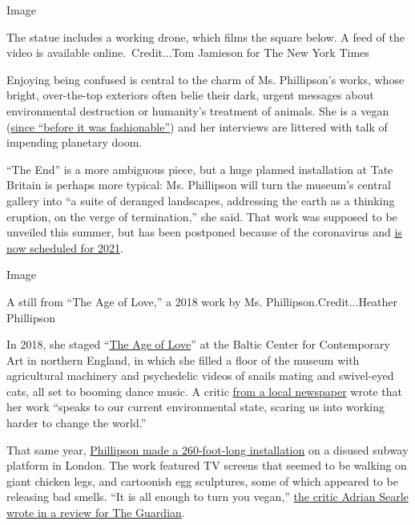 Image

The statue includes a working drone, which films the square below. A
feed of the video is available online.~Credit...Tom Jamieson for The New
York Times

Enjoying being confused is central to the charm of Ms. Phillipson's
works, whose bright, over-the-top exteriors often belie their dark,
urgent messages about environmental destruction or humanity's treatment
of animals. She is a vegan
(\href{https://www.theguardian.com/artanddesign/2018/aug/27/heather-phillipson-interview-vegan-artist-we-torture-eggs}{since
``before it was fashionable''}) and her interviews are littered with
talk of impending planetary doom.

``The End'' is a more ambiguous piece, but a huge planned installation
at Tate Britain is perhaps more typical: Ms. Phillipson will turn the
museum's central gallery into ``a suite of deranged landscapes,
addressing the earth as a thinking eruption, on the verge of
termination,'' she said. That work was supposed to be unveiled this
summer, but has been postponed because of the coronavirus and
\href{https://www.tate.org.uk/whats-on/tate-britain/exhibition/heather-phillipson}{is
now scheduled for 2021}.

Image

A still from ``The Age of Love,'' a 2018 work by Ms.
Phillipson.Credit...Heather Phillipson

In 2018, she staged
``\href{https://baltic.art/whats-on/heatherphillipson}{The Age of
Love}'' at the Baltic Center for Contemporary Art in northern England,
in which she filled a floor of the museum with agricultural machinery
and psychedelic videos of snails mating and swivel-eyed cats, all set to
booming dance music. A critic
\href{http://www.thecourieronline.co.uk/review-the-age-of-love-by-heather-phillipson-baltic/}{from
a local newspaper} wrote that her work ``speaks to our current
environmental state, scaring us into working harder to change the
world.''

That same year,
\href{https://art.tfl.gov.uk/projects/my-name-is-lettie-eggsyrub/}{Phillipson
made a 260-foot-long installation} on a disused subway platform in
London. The work featured TV screens that seemed to be walking on giant
chicken legs, and cartoonish egg sculptures, some of which appeared to
be releasing bad smells. ``It is all enough to turn you vegan,''
\href{https://www.theguardian.com/artanddesign/2018/jun/07/heather-phillipson-review-eggs-sculpture-underground-gloucester-road-tube-london}{the
critic Adrian Searle wrote in a review for The Guardian}.


